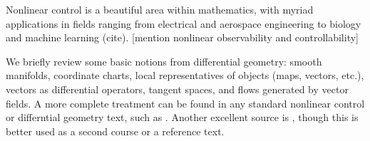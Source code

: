 Nonlinear control is a beautiful area within mathematics, with myriad applications in fields ranging from electrical and aerospace engineering to biology and machine learning (cite). [mention nonlinear observability and controllability]

We briefly review some basic notions from differential geometry: smooth manifolds, coordinate charts, local representatives of objects (maps, vectors, etc.), vectors as differential operators, tangent spaces, and flows generated by vector fields. A more complete treatment can be found in any standard nonlinear control or differntial geometry text, such as \cite{nijmeijer_nonlinear_1990,boothby_2002}. Another excellent source is \cite{abraham_manifolds_1988}, though this is better used as a second course or a reference text. %
